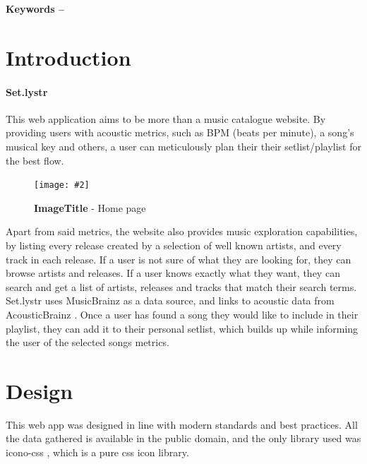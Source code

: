 \documentclass[10pt, a4paper]{article}
\title{\mytitle}
\author{\myauthor\hspace{1em}\\\contact\\Edinburgh Napier University\hspace{0.5em}-\hspace{0.5em}\mymodule}
\date{}
\newcommand{\figuremacro}[5]{
    \begin{figure}[#1]
        \centering
        \texttt{[image: \#2]}
        \caption[#3]{\textbf{#3}#4}
        \label{fig:#2}
    \end{figure}
}
\begin{document}
    \maketitle
    \begin{abstract}
        Set.lystr is a music catalogue exploration/playlist creation tool geared towards musicians who play cover songs. Set.lystr allows its users to search and compare songs and build the ultimate playlist.
    \end{abstract}
    
    \textbf{Keywords -- }{\mykeywords}
    
    \section{Introduction}
    \paragraph{Set.lystr}
    This web application aims to be more than a music catalogue website. By providing users with acoustic metrics, such as BPM (beats per minute), a song's musical key and others, a user can meticulously plan their their setlist/playlist for the best flow.
    
    \figuremacro{h}{index}{ImageTitle}{ - Home page}{1.0}
    
    Apart from said metrics, the website also provides music exploration capabilities, by listing every release created by a selection of well known artists, and every track in each release.
    If a user is not sure of what they are looking for, they can browse artists and releases. If a user knows exactly what they want, they can search and get a list of artists, releases and tracks that match their search terms.
	Set.lystr uses MusicBrainz \cite{journals/expert/Swartz02} as a data source, and links to acoustic data from AcousticBrainz  \cite{conf/ismir/PorterBKTS15}.
	Once a user has found a song they would like to include in their playlist, they can add it to their personal setlist, which builds up while informing the user of the selected songs metrics.
	
	\section{Design}
	This web app was designed in line with modern standards and best practices. All the data gathered is available in the public domain, and the only library used was icono-css \cite{Alipoor}, which is a pure css icon library.
\end{document}
